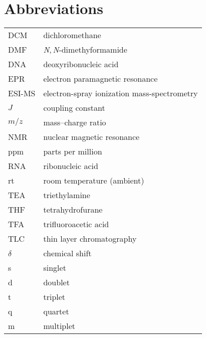 \section*{Abbreviations}

\begin{table}[h]
\begin{tabular}{ll}
DCM & dichloromethane\\
DMF & \emph{N},\,\emph{N}-dimethyformamide\\
DNA	&	deoxyribonucleic acid\\
EPR	& electron paramagnetic resonance\\
ESI-MS & electron-spray ionization mass-spectrometry\\
$J$ & coupling constant\\
$m/z$ & mass--charge ratio\\
NMR	& nuclear magnetic resonance\\
ppm & parts per million\\ 
RNA & ribonucleic acid\\
rt & room temperature (ambient)\\
TEA & triethylamine\\
THF & tetrahydrofurane\\
TFA & trifluoroacetic acid\\
TLC & thin layer chromatography\\
$\delta$	&	chemical shift\\
s & singlet\\
d	&	doublet\\
t	&	triplet\\
q	&	quartet\\
m	&	multiplet\\
\end{tabular}
\end{table}
